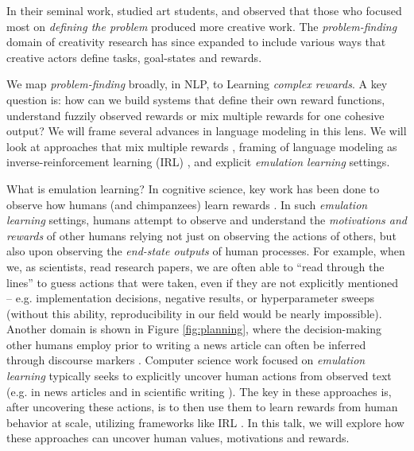 \documentclass[11pt]{article}
\begin{document}
In their seminal work,  studied art students, and observed that those who focused most on \textit{defining the problem} produced more creative work. The \textit{problem-finding} domain of creativity research has since expanded to include various ways that creative actors define tasks, goal-states and rewards. 

We map \textit{problem-finding} broadly, in NLP, to Learning \textit{complex rewards}. A key question is: how can we build systems that define their own reward functions, understand fuzzily observed rewards or mix multiple rewards for one cohesive output? We will frame several advances in language modeling in this lens. We will look at approaches that mix multiple rewards \cite{shi2024decoding}, framing of language modeling as inverse-reinforcement learning (IRL) \cite{wulfmeier2024imitating}, and explicit \textit{emulation learning} settings.

What is emulation learning? In cognitive science, key work has been done to observe how humans (and chimpanzees) learn rewards \cite{hopper2010ghost}. In such \textit{emulation learning} settings, humans attempt to observe and understand the \textit{motivations and rewards} of other humans relying not just on observing the actions of others, but also upon observing the \textit{end-state outputs} of human processes. For example, when we, as scientists, read research papers, we are often able to ``read through the lines'' to guess actions that were taken, even if they are not explicitly mentioned -- e.g. implementation decisions, negative results, or hyperparameter sweeps (without this ability, reproducibility in our field would be nearly impossible). Another domain is shown in Figure \ref{fig:planning}, where the decision-making other humans employ prior to writing a news article can often be inferred through discourse markers \cite{spangher2023identifying}. Computer science work focused on \textit{emulation learning} typically seeks to explicitly uncover human actions from observed text (e.g. in news articles \cite{spangher-etal-2024-tracking} and in scientific writing \cite{starace2025paperbench}). The key in these approaches is, after uncovering these actions, is to then use them to learn rewards from human behavior at scale, utilizing frameworks like IRL \cite{abbeel2004apprenticeship}. In this talk, we will explore how these approaches can uncover human values, motivations and rewards.
\end{document}
